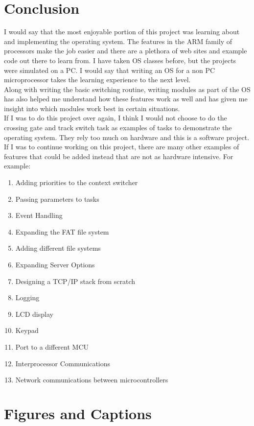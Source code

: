 \documentclass[acmlarge,screen]{acmart}
\begin{document}
\section{Conclusion}
I would say that the most enjoyable portion of this project was learning about and implementing the operating system. The features in the ARM family of processors make the job easier and there are a plethora of web sites and example code out there to learn from. I have taken OS classes before, but the projects were simulated on a PC. I would say that writing an OS for a non PC microprocessor takes the learning experience to the next level.\\
Along with writing the basic switching routine, writing modules as part of the OS has also helped me understand how these features work as well and has given me insight into which modules work best in certain situations.\\
If I was to do this project over again, I think I would not choose to do the crossing gate and track switch task as examples of tasks to demonstrate the operating system. They rely too much on hardware and this is a software project. If I was to continue working on this project, there are many other examples of features that could be added instead that are not as hardware intensive. For example:
\begin{enumerate}
\item Adding priorities to the context switcher
\item Passing parameters to tasks
\item Event Handling
\item Expanding the FAT file system
\item Adding different file systems
\item Expanding Server Options
\item Designing a TCP/IP stack from scratch
\item Logging
\item LCD display
\item Keypad
\item Port to a different MCU
\item Interprocessor Communications
\item Network communications between microcontrollers
\end{enumerate}
\section{Figures and Captions}
\listoffigures
\section{}


\appendix
\end{document}
